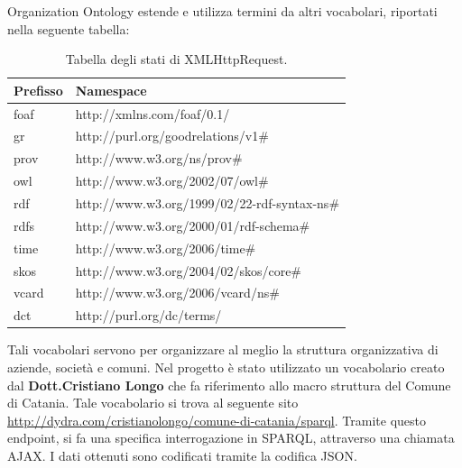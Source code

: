 \documentclass[a4paper,11pt]{article}
\begin{document}
Organization Ontology estende e utilizza termini da altri vocabolari, riportati nella seguente tabella:
\begin{table}[!htb]
\begin{center}				
\begin{tabular}{|>{\small}l|>{\small}l|}
	\hline \textbf{Prefisso} & \textbf{Namespace}\\				
	\hline foaf & http://xmlns.com/foaf/0.1/\\
	\hline gr & http://purl.org/goodrelations/v1\#\\
	\hline prov & http://www.w3.org/ns/prov\#\\
	\hline owl & http://www.w3.org/2002/07/owl\#\\
	\hline rdf & http://www.w3.org/1999/02/22-rdf-syntax-ns\#\\
	\hline rdfs & http://www.w3.org/2000/01/rdf-schema\#\\			
	\hline time & http://www.w3.org/2006/time\#\\
	\hline skos & http://www.w3.org/2004/02/skos/core\#\\					
	\hline vcard & http://www.w3.org/2006/vcard/ns\#\\											\hline 	dct & http://purl.org/dc/terms/\\			
	\hline
\end{tabular}	
\caption{Tabella degli stati di XMLHttpRequest.}	
\end{center}	
\end{table}\newpage
Tali vocabolari servono per organizzare al meglio la struttura organizzativa di aziende, società e comuni.
Nel progetto è stato utilizzato un vocabolario creato dal \textbf{Dott.Cristiano Longo} che fa riferimento allo macro struttura del Comune di Catania.
Tale vocabolario si trova al seguente sito \url{http://dydra.com/cristianolongo/comune-di-catania/sparql}.\newline
Tramite questo endpoint, si fa una specifica interrogazione in SPARQL, attraverso una chiamata AJAX. I dati ottenuti sono codificati tramite la codifica JSON.
\end{document}
